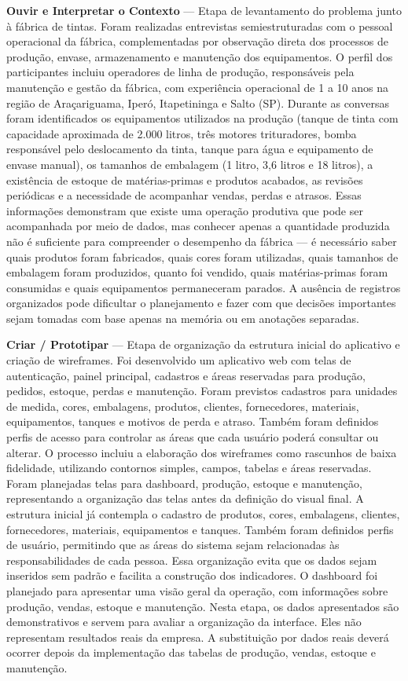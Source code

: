 \documentclass[12pt,a4paper]{article}
\begin{document}
\textbf{Ouvir e Interpretar o Contexto} — Etapa de levantamento do problema junto à fábrica de tintas. Foram realizadas entrevistas semiestruturadas com o pessoal operacional da fábrica, complementadas por observação direta dos processos de produção, envase, armazenamento e manutenção dos equipamentos. O perfil dos participantes incluiu operadores de linha de produção, responsáveis pela manutenção e gestão da fábrica, com experiência operacional de 1 a 10 anos na região de Araçariguama, Iperó, Itapetininga e Salto (SP). Durante as conversas foram identificados os equipamentos utilizados na produção (tanque de tinta com capacidade aproximada de 2.000 litros, três motores trituradores, bomba responsável pelo deslocamento da tinta, tanque para água e equipamento de envase manual), os tamanhos de embalagem (1 litro, 3,6 litros e 18 litros), a existência de estoque de matérias-primas e produtos acabados, as revisões periódicas e a necessidade de acompanhar vendas, perdas e atrasos. Essas informações demonstram que existe uma operação produtiva que pode ser acompanhada por meio de dados, mas conhecer apenas a quantidade produzida não é suficiente para compreender o desempenho da fábrica — é necessário saber quais produtos foram fabricados, quais cores foram utilizadas, quais tamanhos de embalagem foram produzidos, quanto foi vendido, quais matérias-primas foram consumidas e quais equipamentos permaneceram parados. A ausência de registros organizados pode dificultar o planejamento e fazer com que decisões importantes sejam tomadas com base apenas na memória ou em anotações separadas.

\textbf{Criar / Prototipar} — Etapa de organização da estrutura inicial do aplicativo e criação de wireframes. Foi desenvolvido um aplicativo web com telas de autenticação, painel principal, cadastros e áreas reservadas para produção, pedidos, estoque, perdas e manutenção. Foram previstos cadastros para unidades de medida, cores, embalagens, produtos, clientes, fornecedores, materiais, equipamentos, tanques e motivos de perda e atraso. Também foram definidos perfis de acesso para controlar as áreas que cada usuário poderá consultar ou alterar. O processo incluiu a elaboração dos wireframes como rascunhos de baixa fidelidade, utilizando contornos simples, campos, tabelas e áreas reservadas. Foram planejadas telas para dashboard, produção, estoque e manutenção, representando a organização das telas antes da definição do visual final. A estrutura inicial já contempla o cadastro de produtos, cores, embalagens, clientes, fornecedores, materiais, equipamentos e tanques. Também foram definidos perfis de usuário, permitindo que as áreas do sistema sejam relacionadas às responsabilidades de cada pessoa. Essa organização evita que os dados sejam inseridos sem padrão e facilita a construção dos indicadores. O dashboard foi planejado para apresentar uma visão geral da operação, com informações sobre produção, vendas, estoque e manutenção. Nesta etapa, os dados apresentados são demonstrativos e servem para avaliar a organização da interface. Eles não representam resultados reais da empresa. A substituição por dados reais deverá ocorrer depois da implementação das tabelas de produção, vendas, estoque e manutenção.
\end{document}
